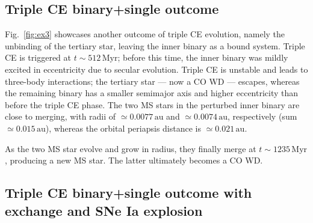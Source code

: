 \documentclass[twocolumn,appendixfloats,tighten]{aastex631}
\newcommand{\au}{\mathrm{au}}
\newcommand{\F}{Fig.}
\newcommand{\myr}{\mathrm{Myr}}
\begin{document}
\subsection{Triple CE binary+single outcome}
\label{sect:ex:3}

\begin{figure*}
\iftoggle{ApJFigs}{
\texttt{[image: system\_1885\_mobile]}
}{
\texttt{[image: figs/system\_1885\_mobile]}
}
\caption{Mobile diagrams for a system in which triple CE leads to the unbinding of the tertiary star. The inner binary (consisting of two MS stars) survives initially, but its orbital periapsis decreases. It merges at a later time when the stars expand during the MS, forming a new single MS star that eventually becomes a CO WD.}
\label{fig:ex3}
\end{figure*}

\F~\ref{fig:ex3} showcases another outcome of triple CE evolution, namely the unbinding of the tertiary star, leaving the inner binary as a bound system. Triple CE is triggered at $t\sim 512\,\myr$; before this time, the inner binary was mildly excited in eccentricity due to secular evolution. Triple CE is unstable and leads to three-body interactions; the tertiary star --- now a CO WD --- escapes, whereas the remaining binary has a smaller semimajor axis and higher eccentricity than before the triple CE phase. The two MS stars in the perturbed inner binary are close to merging, with radii of $\simeq 0.0077\,\au$ and $\simeq 0.0074\,\au$, respectively (sum $\simeq 0.015\,\au$), whereas the orbital periapsis distance is $\simeq 0.021\,\au$. 

As the two MS star evolve and grow in radius, they finally merge at $t\sim 1235\,\myr$, producing a new MS star. The latter ultimately becomes a CO WD. 


\subsection{Triple CE binary+single outcome with exchange and SNe Ia explosion}
\label{sect:ex:4}

\begin{figure*}
\iftoggle{ApJFigs}{
\texttt{[image: system\_9284\_mobile]}
}{
\texttt{[image: figs/system\_9284\_mobile]}
}
\caption{Mobile diagrams for a system in which triple CE occurs with an exchange interaction, leaving a binary with swapped components. The latter subsequently leads to a merger of two WDs and a SNe Ia explosion. Note that the original inner binary, in isolation, would not have been conducive to ultimately producing a SNe explosion. }
\label{fig:ex4}
\end{figure*}
\end{document}
